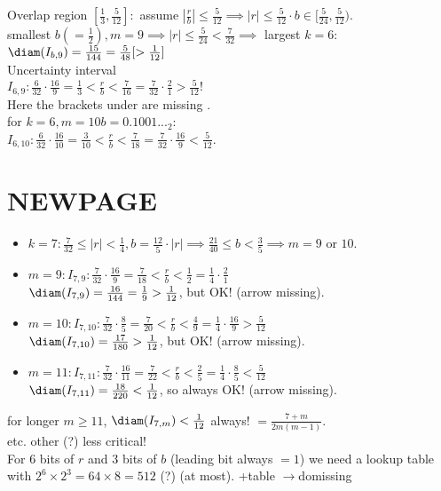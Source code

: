 Overlap region $[\frac{1}{3}, \frac{5}{12}]: $ assume $|\frac{r}{b}|\le \frac{5}{12} \implies |r|\le \frac{5}{12}\cdot b\in [\frac{5}{24}, \frac{5}{12})$. \\

smallest $b(=\frac{1}{2}), m=9\implies |r|\le \frac{5}{24}<\frac{7}{32}\implies$ largest $k=6$: \\

$\diam(I_{b,9})=\frac{15}{144}=\frac{5}{48}[>\frac{1}{12}]$ \\

Uncertainty interval\\
$I_{6,9}: \frac{6}{32}\cdot \frac{16}{9}=\frac{1}{3}<\frac{r}{b}<\frac{7}{16}=\frac{7}{32}\cdot \frac{2}{1}>\frac{5}{12}!$ \\
Here the brackets under are missing . \\

for $k=6, m=10 b=0.1001..._2$: \\
$I_{6,10}: \frac{6}{32}\cdot \frac{16}{10}=\frac{3}{10}<\frac{r}{b}<\frac{7}{18}=\frac{7}{32}\cdot \frac{16}{9}<\frac{5}{12}$.\bigskip

\section*{NEWPAGE}
\begin{itemize}
    \item $k=7: \frac{7}{32}\le |r|<\frac{1}{4}, b=\frac{12}{5}\cdot |r| \implies \frac{21}{40}\le b<\frac{3}{5} \implies m=9 $ or $10$. \item $m=9: I_{7,9}: \frac{7}{32}\cdot \frac{16}{9}=\frac{7}{18}<\frac{r}{b}<\frac{1}{2}=\frac{1}{4}\cdot \frac{2}{1}$ \\
    $\diam(I_{7,9})=\frac{16}{144}=\frac{1}{9}>\frac{1}{12}$, but OK! (arrow missing).
   
    \item $m=10: I_{7,10}: \frac{7}{32}\cdot \frac{8}{5}=\frac{7}{20}<\frac{r}{b}<\frac{4}{9}=\frac{1}{4}\cdot \frac{16}{9}>\frac{5}{12}$ \\
    $\diam(I_{7,10})=\frac{17}{180}>\frac{1}{12}$, but OK! (arrow missing).
   
    \item $m=11: I_{7,11}: \frac{7}{32}\cdot \frac{16}{11}=\frac{7}{22}<\frac{r}{b}<\frac{2}{5}=\frac{1}{4}\cdot \frac{8}{5}<\frac{5}{12}$ \\
    $\diam(I_{7,11})=\frac{18}{220}<\frac{1}{12}$, so always OK! (arrow missing).
    \end{itemize}
    for longer $m\ge 11$, $\diam(I_{7,m})<\frac{1}{12}$ always! $=\frac{7+m}{2m(m-1)}$. \\
    etc. other (?) less critical! \\
    For $6$ bits of $r$ and $3$ bits of $b$ (leading bit always $=1$) we need a lookup table with $2^6\times 2^3=64\times 8=512$ (?) (at most). +table $\to$do{missing}
   
